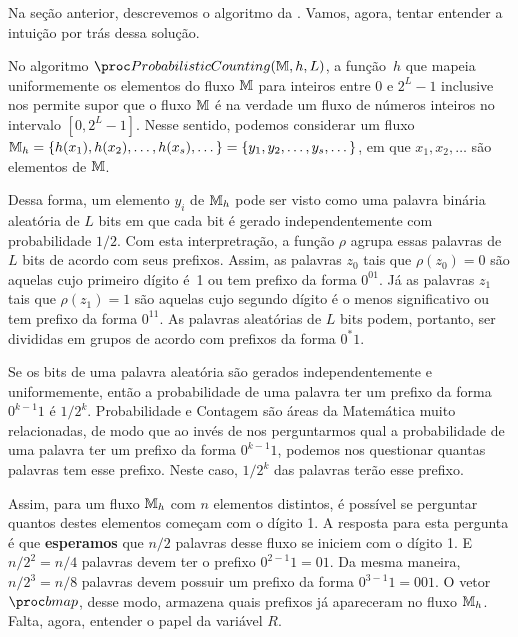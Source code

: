 Na seção anterior, descrevemos o algoritmo da . Vamos, agora, tentar entender a intuição
por trás dessa solução.

No algoritmo $\pc(\Mbb, h, L)$, a função~$h$ que mapeia uniformemente os elementos do fluxo $\mathbb{M}$ para inteiros entre 
$0$ e $2^L - 1$ inclusive nos permite supor que o fluxo $\mathbb{M}$ é na verdade um fluxo de números inteiros no intervalo 
$[0, 2^L - 1]$. Nesse sentido, podemos considerar um fluxo $\mathbb{M}_h = \{ h(x_1), h(x_2), \dots, h(x_s), \dots \} = 
\{ y_1, y_2, \dots, y_s, \dots \} $, em que $x_1, x_2, \dots$ são elementos de $\mathbb{M}$.

Dessa forma, um elemento $y_i$ de $\mathbb{M}_h$ pode ser visto como uma palavra binária aleatória de $L$ bits em que cada bit 
é gerado independentemente com probabilidade $1/2$. Com esta interpretração, a função $\rho$ agrupa essas palavras de 
$L$ bits de acordo com seus prefixos. Assim, as palavras $z_0$ tais que $\rho(z_0) = 0$ são aquelas cujo primeiro dígito 
é~1 ou tem prefixo da forma $0^01$. Já as palavras $z_1$ tais que $\rho(z_1) = 1$ são aquelas cujo segundo dígito é o 
menos significativo ou tem prefixo da forma $0^11$. As palavras aleatórias de $L$ bits podem, portanto, ser divididas em 
grupos de acordo com prefixos da forma $0^{*}1$.

Se os bits de uma palavra aleatória são gerados independentemente e uniformemente, então a probabilidade de uma palavra
ter um prefixo da forma $0^{k-1}1$ é $1/2^{k}$. Probabilidade e Contagem são áreas da Matemática muito relacionadas, de 
modo que ao invés de nos perguntarmos qual a probabilidade de uma palavra ter um prefixo da forma $0^{k-1}1$, podemos 
nos questionar quantas palavras tem esse prefixo. Neste caso, $1/2^{k}$ das palavras terão esse prefixo.

Assim, para um fluxo $\mathbb{M}_h$ com $n$ elementos distintos, é possível se perguntar quantos destes elementos começam com
o dígito 1. A resposta para esta pergunta é que \textbf{esperamos} que $n/2$ palavras desse fluxo se iniciem com o 
dígito 1. E $n/2^2 = n / 4$ palavras devem ter o prefixo $0^{2-1}1 = 01$. Da mesma maneira, $n/2^3 = n/8$ palavras devem 
possuir um prefixo da forma $0^{3-1}1 = 001$. O vetor $\bitmap$, desse modo, armazena quais prefixos já apareceram no 
fluxo $\mathbb{M}_h$. Falta, agora, entender o papel da variável $R$.

